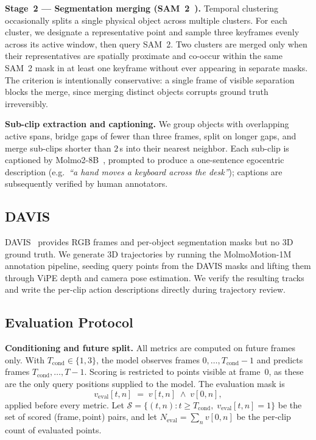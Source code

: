 \noindent\textbf{Stage~2 --- Segmentation merging (SAM~2~\cite{sam2}).}
Temporal clustering occasionally splits a single physical object across
multiple clusters. For each cluster, we designate a representative point and
sample three keyframes evenly across its active window, then query SAM~2. Two
clusters are merged only when their representatives are spatially proximate
and co-occur within the same SAM~2 mask in at least one keyframe without ever
appearing in separate masks. The criterion is intentionally conservative: a
single frame of visible separation blocks the merge, since merging distinct
objects corrupts ground truth irreversibly.

\noindent\textbf{Sub-clip extraction and captioning.}
We group objects with overlapping active spans, bridge gaps of fewer than
three frames, split on longer gaps, and merge sub-clips shorter than $2$\,s
into their nearest neighbor. Each sub-clip is captioned by
Molmo2-8B~\cite{clark2026molmo2}, prompted to produce a one-sentence
egocentric description (e.g.\ \textit{``a hand moves a keyboard across the
desk''}); captions are subsequently verified by human annotators.


\subsection{DAVIS}
\label{subsec:appendix_davis}

DAVIS~\cite{davis} provides RGB frames and per-object segmentation masks but no 3D ground
truth. We generate 3D trajectories by running the MolmoMotion-1M annotation
pipeline, seeding query points from the DAVIS masks and lifting them through
ViPE depth and camera pose estimation. We verify the resulting tracks and write the per-clip action descriptions directly
during trajectory review.


\subsection{Evaluation Protocol}
\label{subsec:appendix_eval}

\noindent\textbf{Conditioning and future split.}
All metrics are computed on future frames only. With $T_\text{cond}\in\{1,3\}$,
the model observes frames $0,\ldots,T_\text{cond}-1$ and predicts frames
$T_\text{cond},\ldots,T-1$. Scoring is restricted to points visible at
frame~$0$, as these are the only query positions supplied to the model.
The evaluation mask is
\[
  v_\text{eval}[t,n] \;=\; v[t,n]\;\wedge\;v[0,n],
\]
applied before every metric. Let $\mathcal{S} = \{(t,n) : t \geq
T_\text{cond},\; v_\text{eval}[t,n]=1\}$ be the set of scored
(frame,\,point) pairs, and let $N_\text{eval} = \sum_n v[0,n]$ be the
per-clip count of evaluated points.

